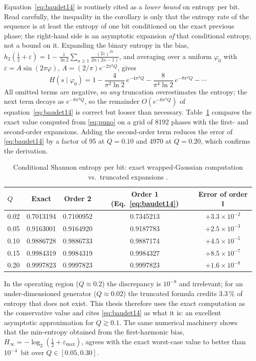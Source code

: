 Equation~\eqref{eq:baudet14} is routinely cited as a \emph{lower bound}
on entropy per bit. Read carefully, the inequality in the corollary is
only that the entropy rate of the sequence is at least the entropy of
one bit conditioned on the exact previous phase; the right-hand side is
an asymptotic expansion \emph{of} that conditional entropy, not a bound
on it. Expanding the binary entropy in the bias,
$h_2(\tfrac12+\varepsilon) = 1 - \tfrac{1}{\ln 2}\sum_{n\ge1}
\tfrac{(2\varepsilon)^{2n}}{2n(2n-1)}$, and averaging over a uniform
$\varphi_0$ with $\varepsilon = A\sin(2\pi\varphi)$,
$A = (2/\pi)e^{-2\pi^2 Q}$, gives
\begin{equation}
  H(s\mid\varphi_0) = 1 - \frac{4}{\pi^2\ln 2}\,e^{-4\pi^2 Q}
                        - \frac{8}{\pi^4\ln 2}\,e^{-8\pi^2 Q} - \cdots
  \label{eq:orden2}
\end{equation}
All omitted terms are negative, so \emph{any} truncation overestimates
the entropy; the next term decays as $e^{-8\pi^2 Q}$, so the remainder
$O(e^{-6\pi^2 Q})$ of equation~\eqref{eq:baudet14} is correct but looser
than necessary.
Table~\ref{tab:exact} compares the exact value computed from
\eqref{eq:puno} on a grid of 8192 phases with the first- and second-order
expansions. Adding the second-order term reduces the error of
\eqref{eq:baudet14} by a factor of 95 at $Q=0.10$ and 4970 at $Q=0.20$,
which confirms the derivation.

\begin{table}[htbp]
\centering
\caption{Conditional Shannon entropy per bit: exact wrapped-Gaussian
computation vs.\ truncated expansions \simu{}.}
\label{tab:exact}
\begin{tabular}{@{}lcccc@{}}
\toprule
$Q$ & Exact & Order 2 & Order 1 (Eq.~\ref{eq:baudet14}) & Error of order 1 \\
\midrule
0.02 & 0.7013194 & 0.7100952 & 0.7345213 & $+3.3\times10^{-2}$ \\
0.05 & 0.9163001 & 0.9164920 & 0.9187783 & $+2.5\times10^{-3}$ \\
0.10 & 0.9886728 & 0.9886733 & 0.9887174 & $+4.5\times10^{-5}$ \\
0.15 & 0.9984319 & 0.9984319 & 0.9984327 & $+8.5\times10^{-7}$ \\
0.20 & 0.9997823 & 0.9997823 & 0.9997823 & $+1.6\times10^{-8}$ \\
\bottomrule
\end{tabular}
\end{table}

In the operating region ($Q\approx0.2$) the discrepancy is $10^{-8}$ and
irrelevant; for an under-dimensioned generator ($Q\approx0.02$) the
truncated formula credits 3.3\,\% of entropy that does not exist. This
thesis therefore uses the exact computation as the conservative value and
cites \eqref{eq:baudet14} as what it is: an excellent asymptotic
approximation for $Q \gtrsim 0.1$. The same numerical machinery shows
that the min-entropy obtained from the first-harmonic bias,
$H_\infty = -\log_2(\tfrac12 + \varepsilon_{\max})$, agrees with the exact
worst-case value to better than $10^{-4}$~bit over $Q\in[0.05, 0.30]$.

